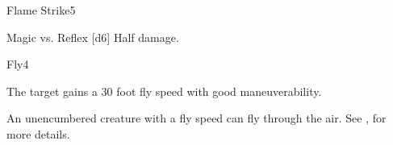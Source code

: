 \begin{spellsection}{Flame Strike}{5}
    \begin{spellheader}
    \end{spellheader}
    \begin{spellcontent}
        \begin{spelltargetinginfo}
        \end{spelltargetinginfo}
        \begin{spelleffects}
            \begin{spellattack}{Magic vs. Reflex}
                \spellsuccess {}[d6]
                \spellfailure Half damage.
            \end{spellattack}
        \end{spelleffects}
    \end{spellcontent}
    \begin{spellfooter}
        \spellnotes \destructivespellnotes

        \firespellnotes
        \miscastyou
    \end{spellfooter}
\end{spellsection}

\begin{spellsection}{Fly}{4}
    \begin{spellheader}
    \end{spellheader}
    \begin{spellcontent}
        \begin{spelltargetinginfo}
        \end{spelltargetinginfo}
        \begin{spelleffects}
            \spelleffect The target gains a 30 foot fly speed with good maneuverability.
            \spelldur \durshort
        \end{spelleffects}
    \end{spellcontent}
    \begin{spellfooter}
        \spellnotes An unencumbered creature with a fly speed can fly through the air. See , for more details.
        \miscastexplode
    \end{spellfooter}%
\end{spellsection}

